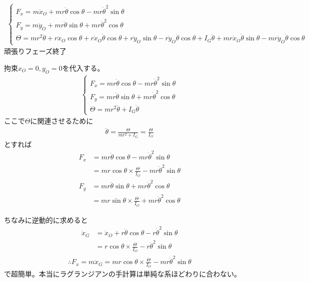 \documentclass[a4paper,11pt]{jsarticle}
\begin{document}
\begin{align*}
  \begin{cases}
    F_x = m\ddot{x}_O + mr\ddot{\theta}\cos\theta - mr\dot{\theta}^2\sin\theta
    \\ F_y = m\ddot{y}_O + mr\ddot{\theta}\sin\theta + mr\dot{\theta}^2\cos\theta
    \\ \Theta = mr^2\ddot{\theta} + r\ddot{x}_O\cos\theta 
    + r\dot{x}_O\dot{\theta}\cos\theta + r\ddot{y}_O\sin\theta - r\dot{y}_O\dot{\theta}\cos\theta + I_G\ddot{\theta}
    + mr\dot{x}_O\dot{\theta}\sin\theta - mr\dot{y}_O\dot{\theta}\cos\theta
  \end{cases}
\end{align*}
頑張りフェーズ終了

拘束$x_O = 0, y_O = 0$を代入する。
\begin{align*}
  \begin{cases}
    F_x = mr\ddot{\theta}\cos\theta - mr\dot{\theta}^2\sin\theta
    \\ F_y = mr\ddot{\theta}\sin\theta + mr\dot{\theta}^2\cos\theta
    \\ \Theta = mr^2\ddot{\theta} + I_G\ddot{\theta}
  \end{cases}
\end{align*}
ここで$\Theta$に関連させるために
\begin{align*}
  \ddot{\theta} = \frac{\Theta}{mr^2 + I_G} = \frac{\Theta}{I_O}
\end{align*}
とすれば
\begin{align*}
  F_x &= mr\ddot{\theta}\cos\theta - mr\dot{\theta}^2\sin\theta
  \\ &= mr\cos\theta\times\frac{\Theta}{I_O} - mr\dot{\theta}^2\sin\theta
\end{align*}
\begin{align*}
  F_y &= mr\ddot{\theta}\sin\theta + mr\dot{\theta}^2\cos\theta
  \\ &= mr\sin\theta\times\frac{\Theta}{I_O} + mr\dot{\theta}^2\cos\theta
\end{align*}

ちなみに逆動的に求めると
\begin{align*}
  \ddot{x}_G &= \ddot{x}_O + r\ddot{\theta}\cos\theta - r\dot{\theta}^2\sin\theta
  \\ &= r\cos\theta\times\frac{\Theta}{I_O} - r\dot{\theta}^2\sin\theta
\end{align*}
\begin{align*}
  \therefore F_x = m\ddot{x}_G = mr\cos\theta\times\frac{\Theta}{I_O} - mr\dot{\theta}^2\sin\theta
\end{align*}
で超簡単。本当にラグランジアンの手計算は単純な系ほどわりに合わない。
\end{document}
